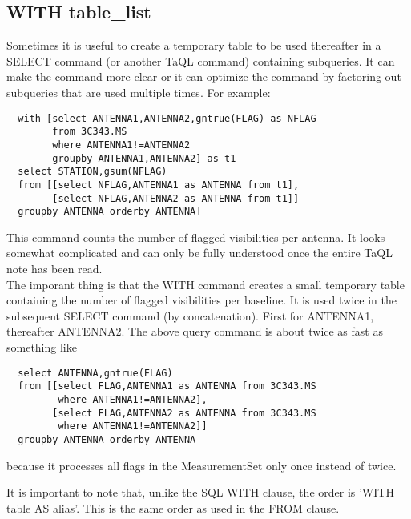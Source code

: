 \subsection{\label{TAQL:WITH}WITH table\_list}
Sometimes it is useful to create a temporary table to be used
thereafter in a SELECT command (or another TaQL command) containing
subqueries. It can make the command more clear or it can optimize the
command by factoring out subqueries that are used multiple times.
For example:
\begin{verbatim}
  with [select ANTENNA1,ANTENNA2,gntrue(FLAG) as NFLAG
        from 3C343.MS
        where ANTENNA1!=ANTENNA2
        groupby ANTENNA1,ANTENNA2] as t1
  select STATION,gsum(NFLAG)
  from [[select NFLAG,ANTENNA1 as ANTENNA from t1],
        [select NFLAG,ANTENNA2 as ANTENNA from t1]]
  groupby ANTENNA orderby ANTENNA]
\end{verbatim}
This command counts the number of flagged visibilities per antenna.
It looks somewhat complicated and can only be fully understood
once the entire TaQL note has been read.
\\The imporant thing is that the WITH command creates a small
temporary table containing the number of 
flagged visibilities per baseline. It is used twice in the subsequent
SELECT command (by concatenation). First for ANTENNA1, thereafter
ANTENNA2.
The above query command is about twice as fast as something like
\begin{verbatim}
  select ANTENNA,gntrue(FLAG)
  from [[select FLAG,ANTENNA1 as ANTENNA from 3C343.MS
         where ANTENNA1!=ANTENNA2],
        [select FLAG,ANTENNA2 as ANTENNA from 3C343.MS
         where ANTENNA1!=ANTENNA2]]
  groupby ANTENNA orderby ANTENNA
\end{verbatim}
because it processes all flags in the MeasurementSet  only once instead of twice.

It is important to note that, unlike the SQL WITH clause, the order is
'WITH table AS alias'. This is the same order as used in the FROM clause.

